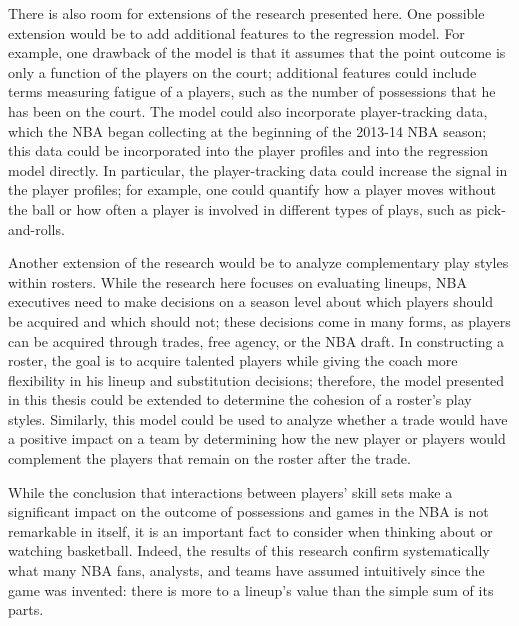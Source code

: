 There is also room for extensions of the research presented here. One possible
extension would be to add additional features to the regression model. For example,
one drawback of the model is that it assumes that the point outcome is only a
function of the players on the court; additional features could include terms
measuring fatigue of a players, such as the number of possessions that he has been
on the court. The model could also incorporate player-tracking data, which the NBA
began collecting at the beginning of the 2013-14 NBA season; this data could be
incorporated into the player profiles and into the regression model directly. In
particular, the player-tracking data could increase the signal in the player
profiles; for example, one could quantify how a player moves without the ball or how
often a player is involved in different types of plays, such as pick-and-rolls.

Another extension of the research would be to analyze complementary play styles
within rosters. While the research here focuses on evaluating lineups, NBA
executives need to make decisions on a season level about which players should be
acquired and which should not; these decisions come in many forms, as players can be
acquired through trades, free agency, or the NBA draft. In constructing a roster,
the goal is to acquire talented players while giving the coach more flexibility in
his lineup and substitution decisions; therefore, the model presented in this thesis
could be extended to determine the cohesion of a roster's play styles. Similarly,
this model could be used to analyze whether a trade would have a positive impact on
a team by determining how the new player or players would complement the players
that remain on the roster after the trade.

While the conclusion that interactions between players' skill sets make a
significant impact on the outcome of possessions and games in the NBA is not
remarkable in itself, it is an important fact to consider when thinking about or
watching basketball. Indeed, the results of this research confirm systematically
what many NBA fans, analysts, and teams have assumed intuitively since the game was
invented: there is more to a lineup's value than the simple sum of its parts.
